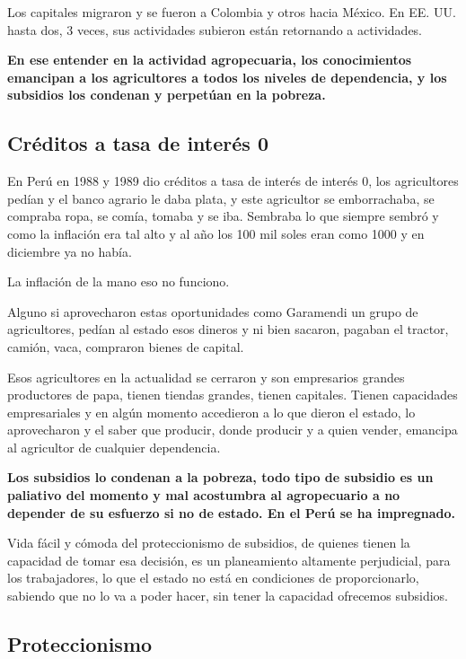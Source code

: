 \documentclass[
  a4paper,
]{article}
\begin{document}
Los capitales migraron y se fueron a Colombia y otros hacia México. En
EE. UU. hasta dos, 3 veces, sus actividades subieron están retornando a
actividades.

\textbf{En ese entender en la actividad agropecuaria, los conocimientos
emancipan a los agricultores a todos los niveles de dependencia, y los
subsidios los condenan y perpetúan en la pobreza.}

\hypertarget{cruxe9ditos-a-tasa-de-interuxe9s-0}{%
\subsection{Créditos a tasa de interés
0}\label{cruxe9ditos-a-tasa-de-interuxe9s-0}}

En Perú en 1988 y 1989 dio créditos a tasa de interés de interés 0, los
agricultores pedían y el banco agrario le daba plata, y este agricultor
se emborrachaba, se compraba ropa, se comía, tomaba y se iba. Sembraba
lo que siempre sembró y como la inflación era tal alto y al año los 100
mil soles eran como 1000 y en diciembre ya no había.

La inflación de la mano eso no funciono.

Alguno si aprovecharon estas oportunidades como Garamendi un grupo de
agricultores, pedían al estado esos dineros y ni bien sacaron, pagaban
el tractor, camión, vaca, compraron bienes de capital.

Esos agricultores en la actualidad se cerraron y son empresarios grandes
productores de papa, tienen tiendas grandes, tienen capitales. Tienen
capacidades empresariales y en algún momento accedieron a lo que dieron
el estado, lo aprovecharon y el saber que producir, donde producir y a
quien vender, emancipa al agricultor de cualquier dependencia.

\textbf{Los subsidios lo condenan a la pobreza, todo tipo de subsidio es
un paliativo del momento y mal acostumbra al agropecuario a no depender
de su esfuerzo si no de estado. En el Perú se ha impregnado.}

Vida fácil y cómoda del proteccionismo de subsidios, de quienes tienen
la capacidad de tomar esa decisión, es un planeamiento altamente
perjudicial, para los trabajadores, lo que el estado no está en
condiciones de proporcionarlo, sabiendo que no lo va a poder hacer, sin
tener la capacidad ofrecemos subsidios.

\hypertarget{proteccionismo}{%
\subsection{Proteccionismo}\label{proteccionismo}}
\end{document}

